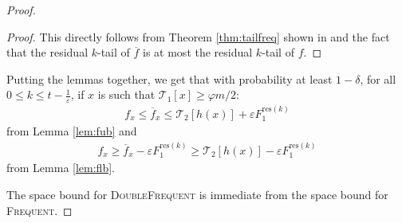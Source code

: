 \documentclass[sigconf,review=true,anonymous=true,screen]{acmart}
\newcommand{\eps}{\varepsilon}
\renewcommand{\phi}{\varphi}
\begin{document}
\begin{proof}
\begin{lemma}
\end{lemma}
\begin{proof}
This directly follows from Theorem \ref{thm:tailfreq} shown in \cite{BCIS} and the fact that the residual $k$-tail of $\overline{f}$ is at most the residual $k$-tail of $f$.
\end{proof}
Putting the lemmas together, we get that with probability at least $1-\delta$, for all $0\leq k \leq t-\frac1\eps$, if $x$ is such that $\mathcal{T}_1[x] \geq \phi m/2$:
\begin{align*}
f_x \leq \overline{f}_x \leq \mathcal{T}_2[h(x)] + \eps {F_1^{\text{res}(k)}}
\end{align*}
from Lemma \ref{lem:fub} and
\begin{align*}
f_x \geq \overline{f}_x - {\eps}{} F_1^{\text{res}(k)} \geq \mathcal{T}_2[h(x)] - {\eps}{} F_1^{\text{res}(k)} 
\end{align*}
from Lemma \ref{lem:flb}.

The space bound for \textsc{DoubleFrequent} is immediate from the space bound for \textsc{Frequent}.
\end{proof}
\end{document}

